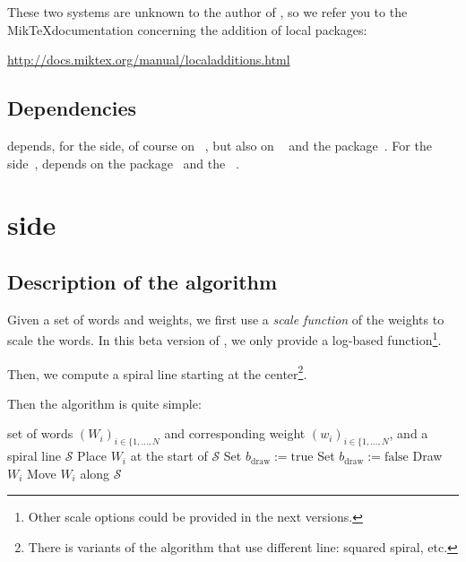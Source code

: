 \documentclass[english]{ltxdoc}
\begin{document}
These two systems are unknown to the author of \wordcloudpkg, so we
refer you to the Mik\TeX documentation concerning the addition of local packages:
\begin{center}
  \url{http://docs.miktex.org/manual/localadditions.html}
\end{center}



\subsection{Dependencies}


\wordcloudpkg depends, for the \MP side, of course on \MP~\cite{ctan-metapost},
but also on ~\cite{ctan-metapost-colorbrewer} and the
 package~\cite{ctan-latexmp}. For the  side~\cite{ctan-lualatex-doc},
\wordcloudpkg depends on  the  package~\cite{ctan-luamplib}
and the ~\cite{ctan-xcolor}.


\section{ side}

\subsection{Description of the algorithm}

Given a set of words and weights, we first use a
\emph{scale function} of the weights to scale the words. In this beta version of
, we only provide a log-based function\footnote{Other scale
options could be provided in the next versions.}. 

Then, we compute a spiral line starting at the center\footnote{There is variants
of the algorithm that use different line: squared spiral, etc.}.

Then the algorithm is quite simple:
\begin{algorithmic}[1]
\Require set of words $(W_i)_{i\in\{1,\dots,N}$ and corresponding weight
$(w_i)_{i\in\{1,\dots,N}$, and a spiral line $\mathcal{S}$
\State Place $W_i$ at the start of $\mathcal{S}$
\Repeat
  \State Set $b_\text{draw}:=\text{true}$
    \State Set $b_\text{draw}:=\text{false}$
    \EndIf
  \EndFor
    \State Draw $W_i$
  \Else
    \State Move $W_i$ along $\mathcal{S}$
  \EndIf
{}
\EndFor
\end{algorithmic}
\end{document}

